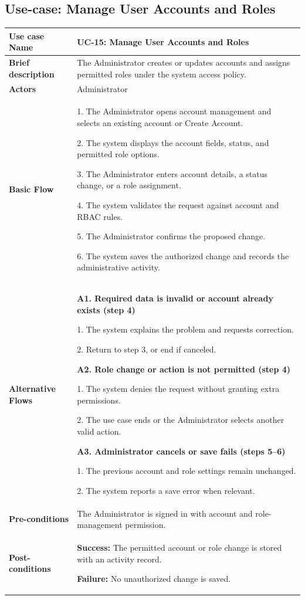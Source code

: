 \subsection{Use-case: Manage User Accounts and Roles}
\label{uc:uc-15}
\begin{longtable}{|p{}|p{}|}
\hline
\textbf{Use case Name} & UC-15: Manage User Accounts and Roles \\ \hline
\textbf{Brief description} & The Administrator creates or updates accounts and assigns permitted roles under the system access policy. \\ \hline
\textbf{Actors} & Administrator \\ \hline
\textbf{Basic Flow} &
1. The Administrator opens account management and selects an existing account or Create Account.\par
2. The system displays the account fields, status, and permitted role options.\par
3. The Administrator enters account details, a status change, or a role assignment.\par
4. The system validates the request against account and RBAC rules.\par
5. The Administrator confirms the proposed change.\par
6. The system saves the authorized change and records the administrative activity.
\\ \hline
\textbf{Alternative Flows} &
\textbf{A1. Required data is invalid or account already exists (step 4)}\par
1. The system explains the problem and requests correction.\par
2. Return to step 3, or end if canceled.
\par\smallskip
\textbf{A2. Role change or action is not permitted (step 4)}\par
1. The system denies the request without granting extra permissions.\par
2. The use case ends or the Administrator selects another valid action.
\par\smallskip
\textbf{A3. Administrator cancels or save fails (steps 5--6)}\par
1. The previous account and role settings remain unchanged.\par
2. The system reports a save error when relevant.
\\ \hline
\textbf{Pre-conditions} & The Administrator is signed in with account and role-management permission. \\ \hline
\textbf{Post-conditions} & \textbf{Success:} The permitted account or role change is stored with an activity record.\par
\textbf{Failure:} No unauthorized change is saved. \\ \hline
\end{longtable}


